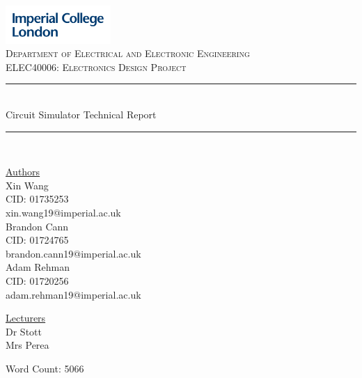 \documentclass[12pt,a4paper]{article}
\begin{document}
\begin{titlepage}
	\newcommand{\HRule}{\rule{\linewidth}{0.5mm}}
    \includegraphics[width = 4cm]{./Images/Logo.jpg}\\[0.5cm] 
    
    \center 
	\textsc{\large Department of Electrical and Electronic Engineering }\\[0.5cm] 
	\textsc{\normalsize ELEC40006: Electronics Design Project}\\[0.5cm] 
    
	\HRule \\[0.4cm]
	Circuit Simulator Technical Report
    \HRule \\[1.5cm]
     
    \begin{center}
		\underline{Authors}\\[0.5cm] Xin Wang\\CID: 01735253\\xin.wang19@imperial.ac.uk\\[0.5cm]
		Brandon Cann\\ CID: 01724765\\ brandon.cann19@imperial.ac.uk\\[0.5cm]
		Adam Rehman\\ CID: 01720256\\adam.rehman19@imperial.ac.uk\\[1.5cm]
	\end{center} \large
	
    \begin{center}
		\underline{Lecturers}\\[0.5cm] Dr Stott\\Mrs Perea\\[0.5cm]
	\end{center} \large

    \vfill %
 	\small Word Count: 5066 \\ [0.5cm]
    \makeatletter
    \@date 
    \makeatother
\end{titlepage}

\tableofcontents
\pagebreak
\end{document}
